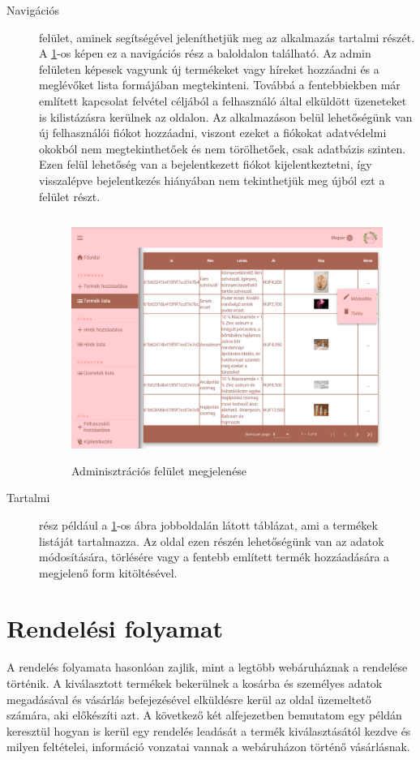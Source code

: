 \begin{description}
	\item[Navigációs]felület, aminek segítségével jeleníthetjük meg az alkalmazás tartalmi részét. A \ref{fig.exemple-6}-os képen ez a navigációs rész a baloldalon található. Az admin felületen képesek vagyunk új termékeket vagy híreket hozzáadni és a meglévőket lista formájában megtekinteni. Továbbá a fentebbiekben már említett kapcsolat felvétel céljából a felhasználó által elküldött üzeneteket is kilistázásra kerülnek az oldalon. Az alkalmazáson belül lehetőségünk van új felhasználói fiókot hozzáadni, viszont ezeket a fiókokat adatvédelmi okokból nem megtekinthetőek és nem törölhetőek, csak adatbázis szinten. Ezen felül lehetőség van a bejelentkezett fiókot kijelentkeztetni, így visszalépve bejelentkezés hiányában nem tekinthetjük meg újból ezt a felület részt.
	\begin{figure}[H]
		\centering
		\includegraphics[width=1.0\textwidth,height=300px]{images/admin.png}
		\caption{Adminisztrációs felület megjelenése}
		\label{fig.exemple-6}
	\end{figure}
	\item[Tartalmi]rész például a \ref{fig.exemple-6}-os ábra jobboldalán látott táblázat, ami a  termékek listáját tartalmazza. Az oldal ezen részén lehetőségünk van az adatok módosítására, törlésére vagy a fentebb említett termék hozzáadására a megjelenő form kitöltésével.
\end{description}

\section{Rendelési folyamat}
A rendelés folyamata hasonlóan zajlik, mint a legtöbb webáruháznak a rendelése történik. A kiválasztott termékek bekerülnek a kosárba és személyes adatok megadásával és vásárlás befejezésével elküldésre kerül az oldal üzemeltető számára, aki előkészíti azt. A következő két alfejezetben bemutatom egy példán keresztül hogyan is kerül egy rendelés leadását a termék kiválasztásától kezdve és milyen feltételei, információ vonzatai vannak a webáruházon történő vásárlásnak.

